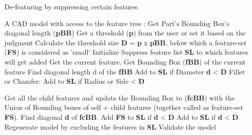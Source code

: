 \begin{algorithm}
	\caption{De-featuring by suppressing certain features}
	\label{alg1}
	\begin{algorithmic}
		\REQUIRE A CAD model with access to the feature tree
		: Get Part's Bounding Box's diagonal length ({\bf pBB})
		\STATE Get a threshold ({\bf p}) from the user or set it based on the judgment 
		\STATE Calculate the threshold size {\bf D} = {\bf p} x {\bf pBB}, below which a feature-set ({\bf FS}) is considered as 'small'
		\STATE  Initialize Suppress feature list {\bf SL} to which features will get added
			\STATE Get the current feature.
			\STATE Get Bounding Box ({\bf fBB}) of the current feature 
			\STATE Find diagonal length d of the {\bf fBB}
				\STATE Add to {\bf SL} if Diameter  {\bf d}  <   {\bf D}
			\ENDIF
				\STATE  Fillet or Chamfer: Add to {\bf SL} if Radius or Side  <  {\bf D}
			\ENDIF

				 \STATE Get all the child features and update the Bounding Box to ({\bf fcBB}) with the Union of Bounding boxes of self + child features (together called as feature-set {\bf FS}). 
				\STATE Find diagonal  {\bf d} of {\bf fcBB}. Add {\bf FS} to {\bf SL} if  {\bf d} <  {\bf D}
			\ENDIF
				\STATE  Add to {\bf SL} if {\bf d} <  {\bf D}
			\ENDIF
		\ENDWHILE
		\STATE  Regenerate model by excluding the features in {\bf SL}
		\STATE  Validate the model
	\end{algorithmic}
\end{algorithm}


